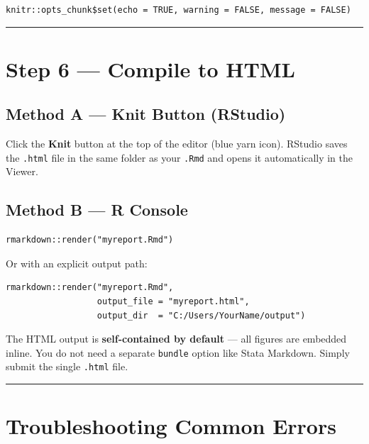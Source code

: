 \documentclass[paper=a4, fontsize=11pt]{scrartcl}
\newcommand{\horrule}[1]{\rule{\linewidth}{#1}}
\begin{document}
\begin{lstlisting}[style=rcode]
knitr::opts_chunk$set(echo = TRUE, warning = FALSE, message = FALSE)
\end{lstlisting}

\bigskip\horrule{0.4pt}\bigskip

\section{Step 6 --- Compile to HTML}

\subsection*{Method A --- Knit Button (RStudio)}

Click the \textbf{Knit} button at the top of the editor (blue yarn icon).
RStudio saves the \texttt{.html} file in the same folder as your \texttt{.Rmd} and
opens it automatically in the Viewer.

\subsection*{Method B --- R Console}

\begin{lstlisting}[style=rcode]
rmarkdown::render("myreport.Rmd")
\end{lstlisting}

Or with an explicit output path:

\begin{lstlisting}[style=rcode]
rmarkdown::render("myreport.Rmd",
                  output_file = "myreport.html",
                  output_dir  = "C:/Users/YourName/output")
\end{lstlisting}

\begin{tipbox}
The HTML output is \textbf{self-contained by default} --- all figures are embedded
inline. You do not need a separate \texttt{bundle} option like Stata Markdown.
Simply submit the single \texttt{.html} file.
\end{tipbox}

\bigskip\horrule{0.4pt}\bigskip

\section{Troubleshooting Common Errors}
\end{document}
